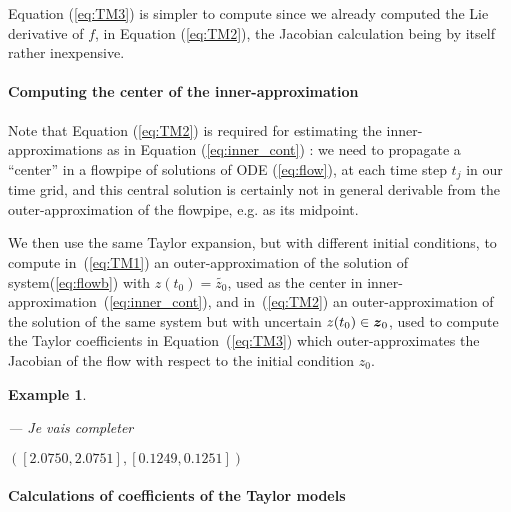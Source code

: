 \documentclass{sig-alternate-05-2015} %
\newcommand\ForAuthors[1]%
 {\par\smallskip                     %
  \begin{center}%
   \fbox%
   {\parbox{0.9\linewidth}%
    {\raggedright\sc--- #1}%
   }%
  \end{center}%
  \par\smallskip                     %
 }
\newtheorem{example}{Example}
\newtheorem{remark}{Remark}
\begin{document}
Equation (\ref{eq:TM3}) 
is simpler to compute since we already computed
the Lie derivative of $f$, in Equation (\ref{eq:TM2}), the Jacobian calculation being by
itself rather 
inexpensive. 

\paragraph{Computing the center of the inner-approximation}

Note that Equation (\ref{eq:TM2}) is required for estimating the inner-approximations as in Equation (\ref{eq:inner_cont}) : we need to propagate a ``center'' in 
a flowpipe of solutions of ODE (\ref{eq:flow}), at each time step $t_j$ in our time
grid, and this central solution is certainly not in general derivable from the 
outer-approximation of the flowpipe, e.g. as its midpoint. 
 
We then use the same Taylor expansion, but with different initial conditions, to compute in~(\ref{eq:TM1}) an outer-approximation of the solution of system(\ref{eq:flowb}) 
with $z(t_0)=\tilde{z_0}$, used as the center in inner-approximation~(\ref{eq:inner_cont}), and  in~(\ref{eq:TM2}) an outer-approximation of the solution of the 
same system but with uncertain $z(t_0) \in \z_0$, used to compute the Taylor coefficients in Equation~(\ref{eq:TM3}) which outer-approximates the Jacobian of the flow 
with respect to the initial condition $z_0$. 

\begin{example}
\ForAuthors{Je vais completer}
$\left(\left[    2.0750,    2.0751\right],  
\left[    0.1249,    0.1251\right]\right)$ 
\end{example}

\paragraph{Calculations of coefficients of the Taylor models}
\end{document}
